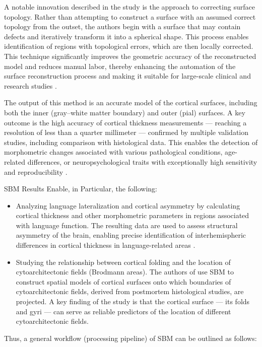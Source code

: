 \documentclass[default]{subfiles}
\begin{document}
A notable innovation described in the study is the approach to correcting surface topology. Rather than attempting to
construct a surface with an assumed correct topology from the outset, the authors begin with a surface that may contain
defects and iteratively transform it into a spherical shape. This process enables identification of regions with
topological errors, which are then locally corrected. This technique significantly improves the geometric accuracy of
the reconstructed model and reduces manual labor, thereby enhancing the automation of the surface reconstruction
process and making it suitable for large-scale clinical and research studies \cite{yotter_2011}.

The output of this method is an accurate model of the cortical surfaces, including both the inner (gray–white matter
boundary) and outer (pial) surfaces. A key outcome is the high accuracy of cortical thickness measurements — reaching a
resolution of less than a quarter millimeter — confirmed by multiple validation studies, including comparison with
histological data. This enables the detection of morphometric changes associated with various pathological conditions,
age-related differences, or neuropsychological traits with exceptionally high sensitivity and reproducibility
\cite{has_2016}.

SBM Results Enable, in Particular, the following:
\begin{itemize}
    \item Analyzing language lateralization and cortical asymmetry by calculating cortical thickness and other
    morphometric parameters in regions associated with language function. The resulting data are used to assess
    structural asymmetry of the brain, enabling precise identification of interhemispheric differences in cortical
    thickness in language-related areas \cite{greve_2013}.
    
    \item Studying the relationship between cortical folding and the location of cytoarchitectonic fields
    (Brodmann areas). The authors of \cite{fischl_2008} use SBM to construct spatial models of cortical surfaces onto
    which boundaries of cytoarchitectonic fields, derived from postmortem histological studies, are projected. A key
    finding of the study is that the cortical surface — its folds and gyri — can serve as reliable predictors of the
    location of different cytoarchitectonic fields.
\end{itemize}

Thus, a general workflow (processing pipeline) of SBM can be outlined as follows:\newline
\end{document}
